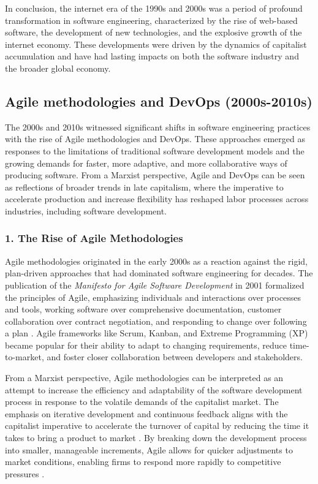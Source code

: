 \begin{refsection}
\begin{multicols}{2}
{In conclusion, the internet era of the 1990s and 2000s was a period of profound transformation in software engineering, characterized by the rise of web-based software, the development of new technologies, and the explosive growth of the internet economy. These developments were driven by the dynamics of capitalist accumulation and have had lasting impacts on both the software industry and the broader global economy.

}
\subsection{Agile methodologies and DevOps (2000s-2010s)}
{\small
The 2000s and 2010s witnessed significant shifts in software engineering practices with the rise of Agile methodologies and DevOps. These approaches emerged as responses to the limitations of traditional software development models and the growing demands for faster, more adaptive, and more collaborative ways of producing software. From a Marxist perspective, Agile and DevOps can be seen as reflections of broader trends in late capitalism, where the imperative to accelerate production and increase flexibility has reshaped labor processes across industries, including software development.

\subsubsection*{1. The Rise of Agile Methodologies}

Agile methodologies originated in the early 2000s as a reaction against the rigid, plan-driven approaches that had dominated software engineering for decades. The publication of the \textit{Manifesto for Agile Software Development} in 2001 formalized the principles of Agile, emphasizing individuals and interactions over processes and tools, working software over comprehensive documentation, customer collaboration over contract negotiation, and responding to change over following a plan \cite{beck2001agile}. Agile frameworks like Scrum, Kanban, and Extreme Programming (XP) became popular for their ability to adapt to changing requirements, reduce time-to-market, and foster closer collaboration between developers and stakeholders.

From a Marxist perspective, Agile methodologies can be interpreted as an attempt to increase the efficiency and adaptability of the software development process in response to the volatile demands of the capitalist market. The emphasis on iterative development and continuous feedback aligns with the capitalist imperative to accelerate the turnover of capital by reducing the time it takes to bring a product to market \cite{harvey1989condition}. By breaking down the development process into smaller, manageable increments, Agile allows for quicker adjustments to market conditions, enabling firms to respond more rapidly to competitive pressures \cite{fuchs2014digital}.

}
\end{multicols}
\end{refsection}
